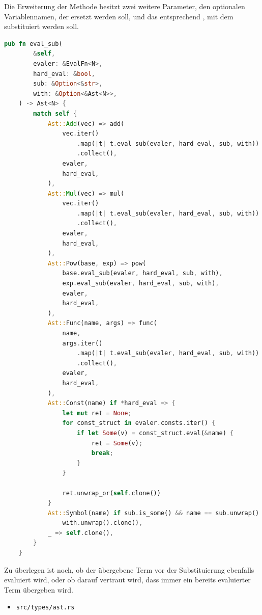 \documentclass[11pt,a4paper, ngerman]{article}
\begin{document}
Die Erweiterung der Methode besitzt zwei weitere Parameter, den optionalen Variablennamen, der ersetzt werden soll, und das entsprechend , mit dem substituiert werden soll.
\begin{lstlisting}[language=rust, caption={Erweiterung pub fn eval}]
    pub fn eval_sub(
        &self,
        evaler: &EvalFn<N>,
        hard_eval: &bool,
        sub: &Option<&str>,
        with: &Option<&Ast<N>>,
    ) -> Ast<N> {
        match self {
            Ast::Add(vec) => add(
                vec.iter()
                    .map(|t| t.eval_sub(evaler, hard_eval, sub, with))
                    .collect(),
                evaler,
                hard_eval,
            ),
            Ast::Mul(vec) => mul(
                vec.iter()
                    .map(|t| t.eval_sub(evaler, hard_eval, sub, with))
                    .collect(),
                evaler,
                hard_eval,
            ),
            Ast::Pow(base, exp) => pow(
                base.eval_sub(evaler, hard_eval, sub, with),
                exp.eval_sub(evaler, hard_eval, sub, with),
                evaler,
                hard_eval,
            ),
            Ast::Func(name, args) => func(
                name,
                args.iter()
                    .map(|t| t.eval_sub(evaler, hard_eval, sub, with))
                    .collect(),
                evaler,
                hard_eval,
            ),
            Ast::Const(name) if *hard_eval => {
                let mut ret = None;
                for const_struct in evaler.consts.iter() {
                    if let Some(v) = const_struct.eval(&name) {
                        ret = Some(v);
                        break;
                    }
                }

                ret.unwrap_or(self.clone())
            }
            Ast::Symbol(name) if sub.is_some() && name == sub.unwrap() => 
                with.unwrap().clone(),
            _ => self.clone(),
        }
    }
\end{lstlisting}

Zu überlegen ist noch, ob der übergebene Term vor der Substituierung ebenfalls evaluiert wird, oder ob darauf vertraut wird, dass immer ein bereits evaluierter Term übergeben wird.

\begin{itemize}
    \item \begin{verbatim}src/types/ast.rs\end{verbatim}
\end{itemize}
\end{document}
